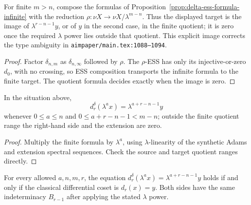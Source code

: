 \begin{proposition}
  \label{prop:delta-ess-formula-finite}
  \notready
  For finite $m>n$, compose the formulas of
  Proposition~\ref{prop:delta-ess-formula-infinite} with the reduction
  $\rho:\nu X\to\nu X/\lambda^{m-n}$.  Thus the displayed target is the image
  of $\lambda^{r-n-1}y$, or of $y$ in the second case, in the finite quotient;
  it is zero once the required $\lambda$ power lies outside that quotient.
  This explicit image corrects the type ambiguity in
  \texttt{aimpaper/main.tex:1088--1094}.
\end{proposition}

\begin{proof}
  Factor $\delta_{n,m}$ as $\delta_{n,\infty}$ followed by $\rho$.  The
  $\rho$-ESS has only its injective-or-zero $d_0$, with no crossing, so ESS
  composition transports the infinite formula to the finite target.  The
  quotient formula decides exactly when the image is zero.
\end{proof}

\begin{corollary}
  \label{cor:delta-ess-lambda-multiples}
  \notready
  In the situation above,
  \[
    d_r^\delta(\lambda^a x)=\lambda^{a+r-n-1}y
  \]
  whenever $0\le a\le n$ and
  $0\le a+r-n-1<m-n$; outside the finite quotient range the right-hand side
  and the extension are zero.
\end{corollary}

\begin{proof}
  Multiply the finite formula by $\lambda^a$, using $\lambda$-linearity of the
  synthetic Adams and extension spectral sequences.  Check the source and
  target quotient ranges directly.
\end{proof}

\begin{theorem}
  \label{thm:delta-classical-equivalence}
  \notready
  For every allowed $a,n,m,r$, the equation
  $d_r^\delta(\lambda^a x)=\lambda^{a+r-n-1}y$ holds if and only if the
  classical differential coset is $d_r(x)=y$.  Both sides have the same
  indeterminacy $B_{r-1}$ after applying the stated $\lambda$ power.
\end{theorem}

